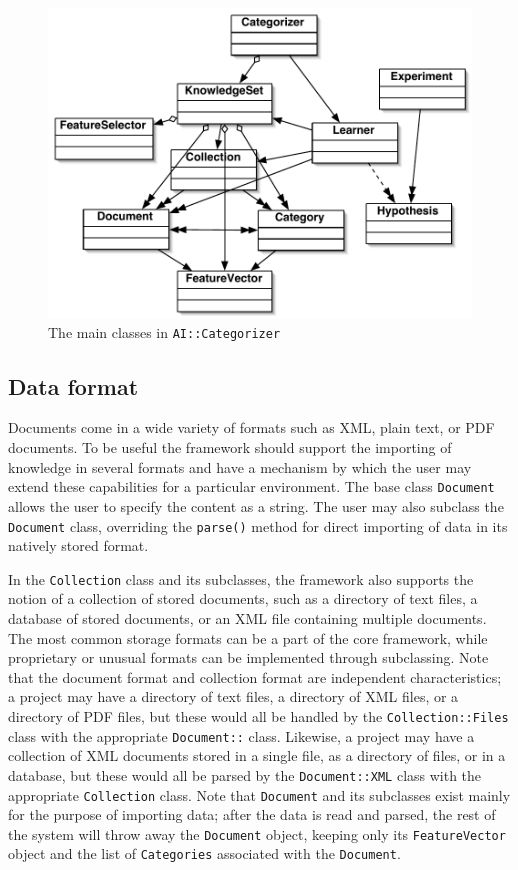 \documentclass[a4paper,twocolumn]{article}
\begin{document}
\begin{figure}
\includegraphics[width=\linewidth]{classes-uml}
\caption{The main classes in \texttt{AI::Categorizer}}
\label{classes}
\end{figure}


\subsection{Data format}
Documents come in a wide variety of formats such as XML, plain text,
or PDF documents.  To be useful the framework should support the
importing of knowledge in several formats and have a mechanism by
which the user may extend these capabilities for a particular
environment.  The base class \texttt{Document} allows the user to
specify the content as a string.  The user may also subclass the
\texttt{Document} class, overriding the \texttt{parse()} method for
direct importing of data in its natively stored format.

In the \texttt{Collection} class and its subclasses, the framework
also supports the notion of a collection of stored documents, such as
a directory of text files, a database of stored documents, or an XML
file containing multiple documents.  The most common storage formats
can be a part of the core framework, while proprietary or unusual
formats can be implemented through subclassing.  Note that the
document format and collection format are independent characteristics;
a project may have a directory of text files, a directory of XML
files, or a directory of PDF files, but these would all be handled by
the \texttt{Collection::Files} class with the appropriate
\texttt{Document::} class.  Likewise, a project may have a collection
of XML documents stored in a single file, as a directory of files, or
in a database, but these would all be parsed by the
\texttt{Document::XML} class with the appropriate \texttt{Collection}
class. Note that \texttt{Document} and its subclasses exist mainly for
the purpose of importing data; after the data is read and parsed, the
rest of the system will throw away the \texttt{Document} object,
keeping only its \texttt{FeatureVector} object and the list of
\texttt{Categories} associated with the \texttt{Document}.
\end{document}
